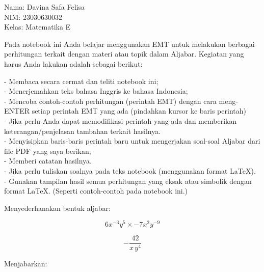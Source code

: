 \documentclass[a4paper,10pt]{article}
\begin{document}
\begin{eulernotebook}
\begin{eulercomment}
Nama: Davina Safa Felisa\\
NIM: 23030630032\\
Kelas: Matematika E

\begin{eulercomment}
\begin{eulercomment}
Pada notebook ini Anda belajar menggunakan EMT untuk melakukan
berbagai perhitungan terkait dengan materi atau topik dalam Aljabar.
Kegiatan yang harus Anda lakukan adalah sebagai berikut:

- Membaca secara cermat dan teliti notebook ini;\\
- Menerjemahkan teks bahasa Inggris ke bahasa Indonesia;\\
- Mencoba contoh-contoh perhitungan (perintah EMT) dengan cara
meng-ENTER setiap perintah EMT yang ada (pindahkan kursor ke baris
perintah)\\
- Jika perlu Anda dapat memodifikasi perintah yang ada dan memberikan
keterangan/penjelasan tambahan terkait hasilnya.\\
- Menyisipkan baris-baris perintah baru untuk mengerjakan soal-soal
Aljabar dari file PDF yang saya berikan;\\
- Memberi catatan hasilnya.\\
- Jika perlu tuliskan soalnya pada teks notebook (menggunakan format
LaTeX).\\
- Gunakan tampilan hasil semua perhitungan yang eksak atau simbolik
dengan format LaTeX. (Seperti contoh-contoh pada notebook ini.)

\end{eulercomment}
\begin{eulercomment}
Menyederhanakan bentuk aljabar:

\end{eulercomment}
\begin{eulerformula}
\[
6x^{-3}y^5\times -7x^2y^{-9}
\]
\end{eulerformula}
\begin{eulercomment}
\end{eulercomment}
\begin{eulerformula}
\[
-\frac{42}{x\,y^4}
\]
\end{eulerformula}
\begin{eulercomment}
Menjabarkan:


\end{eulercomment}
\end{eulercomment}
\end{eulercomment}
\end{eulernotebook}
\end{document}
